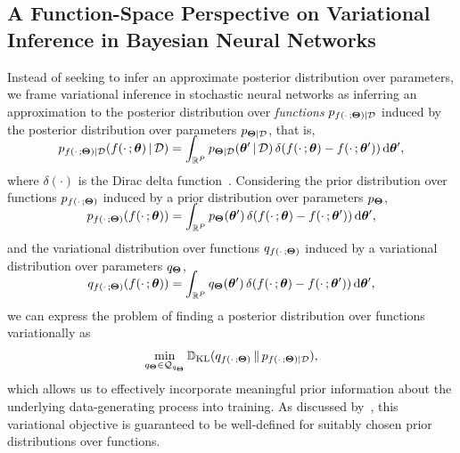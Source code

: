 %

\subsection{A Function-Space Perspective on Variational Inference in Bayesian Neural Networks}
%
\label{sec:theory}

Instead of seeking to infer an approximate posterior distribution over parameters, we frame variational inference in stochastic neural networks as inferring an approximation to the posterior distribution over \emph{functions} $ p_{f(\cdot \,; \boldsymbol{\Theta}) | \mathcal{D}}$ induced by the posterior distribution over parameters $p_{\boldsymbol{\Theta} | \mathcal{D}}$, that is,
\begin{align}
\SwapAboveDisplaySkip
    p_{f(\cdot \,; \bTheta) | \calD}(f(\cdot \,; \btheta) \vbar \calD)
    =
    \int_{\R^{P}} p_{\bTheta | \calD}(\btheta' \vbar \calD) \, \delta( f(\cdot \,; \btheta) - f(\cdot \,; \btheta') ) \dee \btheta' ,
\end{align}
where $\delta(\cdot)$ is the Dirac delta function~\citep{wolpert1993fsmap}.
Considering the prior distribution over functions $p_{f(\cdot \,; \boldsymbol{\Theta})}$ induced by a prior distribution over parameters $p_{\boldsymbol{\Theta}}$,
\begin{align}
\SwapAboveDisplaySkip
    p_{f(\cdot \,; \bTheta)}(f(\cdot \,; \btheta))
    =
    \int_{\R^{P}} p_{\bTheta}(\btheta') \, \delta( f(\cdot \,; \btheta) - f(\cdot \,; \btheta') ) \dee \btheta' ,
\end{align}
and the variational distribution over functions $q_{f( \cdot \,; \boldsymbol{\Theta})}$ induced by a variational distribution over parameters $q_{\boldsymbol{\Theta}}$,
\begin{align}
\SwapAboveDisplaySkip
    q_{f( \cdot \,; \bTheta)}(f(\cdot \,; \btheta))
    =
    \int_{\R^{P}} q_{\bTheta}({\btheta'}) \, \delta( f(\cdot \,; \btheta) - f(\cdot \,; \btheta') ) \dee \btheta' ,
\end{align}
we can express the problem of finding a posterior distribution over functions variationally as
\begin{align}
%
    \min_{q_{\bTheta} \in \calQ_{q_{\bTheta}}} \DD_{\textrm{KL}}( q_{f( \cdot \,; \bTheta)} \,\|\, p_{f(\cdot \,; \bTheta) | \calD} ) ,
\end{align}
which allows us to effectively incorporate meaningful prior information about the underlying data-generating process into training.
As discussed by~\citet{burt2021understanding}, this variational objective is guaranteed to be well-defined for suitably chosen prior distributions over functions.
